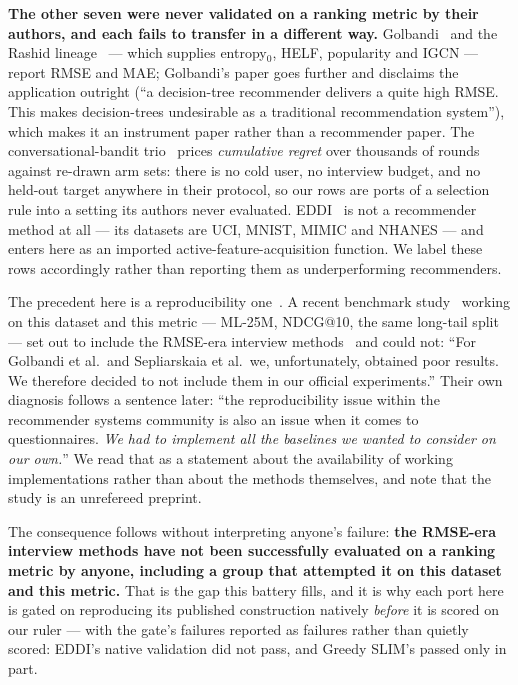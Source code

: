 \documentclass[11pt]{article}
\begin{document}
\textbf{The other seven were never validated on a ranking metric by their authors, and each fails to
transfer in a different way.} Golbandi~\cite{golbandi2011adaptive} and the Rashid
lineage~\cite{rashid2002getting,rashid2008learning} --- which supplies entropy$_0$, HELF,
popularity and IGCN --- report RMSE and MAE; Golbandi's paper goes further and disclaims the
application outright (``a decision-tree recommender delivers a quite high RMSE. This makes
decision-trees undesirable as a traditional recommendation system''), which makes it an instrument
paper rather than a recommender paper. The conversational-bandit
trio~\cite{zhang2020conucb,wang2023conlinucb,liu2025clisk} prices \emph{cumulative regret}
over thousands of rounds against re-drawn arm sets: there is no cold user, no interview budget, and no
held-out target anywhere in their protocol, so our rows are ports of a selection rule into a setting
its authors never evaluated. EDDI~\cite{ma2019eddi} is not a recommender method at all --- its
datasets are UCI, MNIST, MIMIC and NHANES --- and enters here as an imported
active-feature-acquisition function. We label
these rows accordingly rather than reporting them as underperforming recommenders.

The precedent here is a reproducibility one~\cite{dacrema2019progress}. A recent benchmark
study~\cite{proissl2024greedyslim} working on this dataset and
this metric --- ML-25M, NDCG@10, the same long-tail split --- set out to include the RMSE-era
interview methods~\cite{golbandi2011adaptive,sepliarskaia2018spq} and could not: ``For Golbandi et
al.\ and Sepliarskaia et al.\ we, unfortunately,
obtained poor results. We therefore decided to not include them in our official experiments.'' Their
own diagnosis follows a sentence later: ``the reproducibility issue within the recommender systems
community is also an issue when it comes to questionnaires. \emph{We had to implement all the
baselines we wanted to consider on our own.}'' We read that as a statement about the availability of
working implementations rather than about the methods themselves, and note that the study is an
unrefereed preprint.

The consequence follows without interpreting anyone's failure: \textbf{the RMSE-era interview methods have not been successfully evaluated on a ranking
metric by anyone, including a group that attempted it on this dataset and this metric.} That is the
gap this battery fills, and it is why each port here is gated on reproducing its published
construction natively \emph{before} it is scored on our ruler --- with the gate's failures reported
as failures rather than quietly scored: EDDI's native validation did not pass, and Greedy SLIM's passed
only in part.
\end{document}
